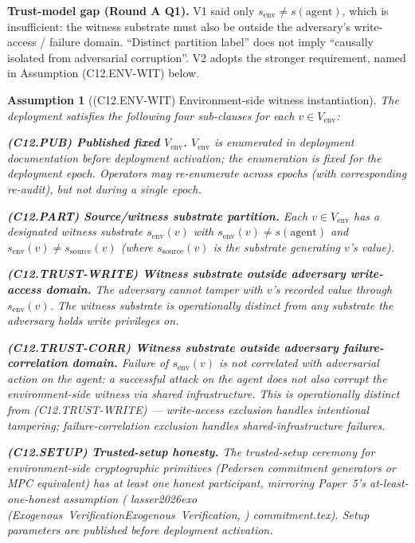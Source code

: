 \documentclass{article}
\makeatletter
\newcommand{\citep}[2][]{%
  \begingroup
  \def\@tmpkey{#2}%
  \ifx\@tmpkey\@empty\else
    (\ifx\@empty#1\@empty\else #1, \fi
     \@nameuse{bibkey@\@tmpkey})%
  \fi
  \endgroup
}
\newtheorem{assumption}{Assumption}
\newcommand{\Vem}{V_{\mathrm{env}}}
\makeatother
\begin{document}
\textbf{Trust-model gap (Round A Q1).}  V1 said only
$s_{\mathrm{env}} \neq s(\mathrm{agent})$, which is insufficient:
the witness substrate must also be outside the adversary's
write-access / failure domain.  ``Distinct partition label'' does
not imply ``causally isolated from adversarial corruption''.  V2
adopts the stronger requirement, named in Assumption (C12.ENV-WIT)
below.

\begin{assumption}[(C12.ENV-WIT) Environment-side witness instantiation]
\label{ass:C12-EW}
The deployment satisfies the following four sub-clauses for each
$v \in \Vem$:

\textbf{(C12.PUB) Published fixed $\Vem$.}  $\Vem$ is enumerated
in deployment documentation before deployment activation; the
enumeration is fixed for the deployment epoch.  Operators may
re-enumerate across epochs (with corresponding re-audit), but not
during a single epoch.

\textbf{(C12.PART) Source/witness substrate partition.}  Each
$v \in \Vem$ has a designated witness substrate $s_{\mathrm{env}}(v)$
with $s_{\mathrm{env}}(v) \neq s(\mathrm{agent})$ and
$s_{\mathrm{env}}(v) \neq s_{\mathrm{source}}(v)$ (where
$s_{\mathrm{source}}(v)$ is the substrate generating $v$'s value).

\textbf{(C12.TRUST-WRITE) Witness substrate outside adversary
write-access domain.}  The adversary cannot tamper with $v$'s
recorded value through $s_{\mathrm{env}}(v)$.  The witness
substrate is operationally distinct from any substrate the
adversary holds write privileges on.

\textbf{(C12.TRUST-CORR) Witness substrate outside adversary
failure-correlation domain.}  Failure of $s_{\mathrm{env}}(v)$ is
not correlated with adversarial action on the agent: a successful
attack on the agent does not also corrupt the environment-side
witness via shared infrastructure.  This is operationally distinct
from (C12.TRUST-WRITE) — write-access exclusion handles
intentional tampering; failure-correlation exclusion handles
shared-infrastructure failures.

\textbf{(C12.SETUP) Trusted-setup honesty.}  The trusted-setup
ceremony for environment-side cryptographic primitives (Pedersen
commitment generators or MPC equivalent) has at least one honest
participant, mirroring Paper~5's at-least-one-honest assumption
(\citep[Exogenous~Verification]{lasser2026exo} commitment.tex).
Setup parameters are published before deployment activation.


\end{assumption}
\end{document}
